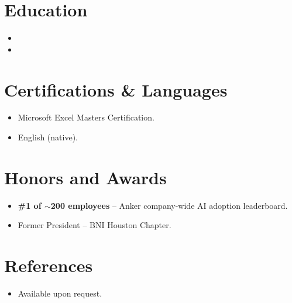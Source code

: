 \documentclass[11pt,letterpaper,sans]{moderncv}
\begin{document}
\section{Education}
\vspace{1pt}
\begin{itemize}

\item{}

\vspace{3pt}

\item{}

\end{itemize}


\section{Certifications \& Languages}
\vspace{1pt}
\begin{itemize}
\item Microsoft Excel Masters Certification.
\item English (native).
\end{itemize}


\section{Honors and Awards}
\vspace{1pt}
\begin{itemize}
\item{\textbf{\#1 of $\sim$200 employees} -- Anker company-wide AI adoption leaderboard.}
\item{Former President -- BNI Houston Chapter.}
\end{itemize}


\section{References}
\vspace{1pt}
\begin{itemize}
\item{Available upon request.}
\end{itemize}
\end{document}
